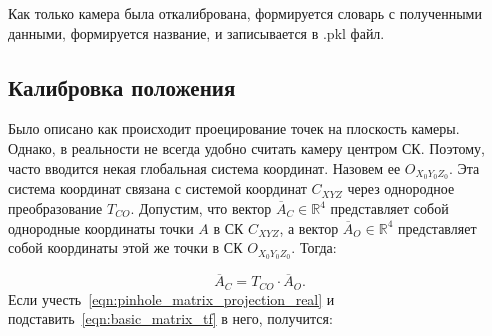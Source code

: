 \documentclass[12pt, a4paper]{article}
\begin{document}
Как только камера была откалибрована, формируется словарь с полученными данными, формируется название, и записывается в .pkl файл.

    

\subsection{Калибровка положения}
\label{sec:position-calib}

Было описано как происходит проецирование точек на плоскость камеры. Однако, в
реальности не всегда удобно считать камеру центром СК. Поэтому, часто вводится
некая глобальная система координат. Назовем ее $O_{X_0Y_0Z_0}$. Эта система
координат связана с системой координат $C_{XYZ}$ через однородное
преобразование $T_{CO}$. Допустим, что вектор $\overline{A}_C \in \mathbb{R}^4$
представляет собой однородные координаты точки $A$ в СК $C_{XYZ}$, а вектор
$\overline{A}_O \in \mathbb{R}^4$ представляет собой координаты этой же точки в
СК $O_{X_0Y_0Z_0}$. Тогда:

\begin{equation}
    \overline{A}_C = T_{CO} \cdot \overline{A}_O.
\label{eqn:basic_matrix_tf}
\end{equation}
Если учесть~\eqref{eqn:pinhole_matrix_projection_real} и
подставить~\eqref{eqn:basic_matrix_tf} в него, получится:
\end{document}
